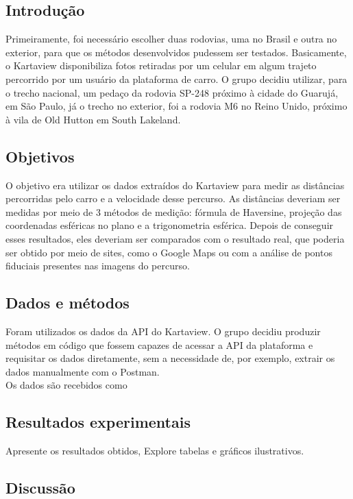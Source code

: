 \documentclass{article}
\begin{document}
\subsection{Introdução}

Primeiramente, foi necessário escolher duas rodovias, uma no Brasil e outra no exterior, para que os métodos desenvolvidos pudessem ser testados. Basicamente, o Kartaview disponibiliza fotos retiradas por um celular em algum trajeto percorrido por um usuário da plataforma de carro. O grupo decidiu utilizar, para o trecho nacional, um pedaço da rodovia SP-248 próximo à cidade do Guarujá, em São Paulo, já o trecho no exterior, foi a rodovia M6 no Reino Unido, próximo à vila de Old Hutton em South Lakeland.

\subsection{Objetivos}

O objetivo era utilizar os dados extraídos do Kartaview para medir as distâncias percorridas pelo carro e a velocidade desse percurso. As distâncias deveriam ser medidas por meio de 3 métodos de medição: fórmula de Haversine, projeção das coordenadas esféricas no plano e a trigonometria esférica. Depois de conseguir esses resultados, eles deveriam ser comparados com o resultado real, que poderia ser obtido por meio de sites, como o Google Maps ou com a análise de pontos fiduciais presentes nas imagens do percurso.

\subsection{Dados e métodos}

Foram utilizados os dados da API do Kartaview. O grupo decidiu produzir métodos em código que fossem capazes de acessar a API da plataforma e requisitar os dados diretamente, sem a necessidade de, por exemplo, extrair os dados manualmente com o Postman.
\\
Os dados são recebidos como 

\subsection{Resultados experimentais}

Apresente os resultados obtidos, Explore tabelas e gráficos ilustrativos.

\subsection{Discussão}
\end{document}
